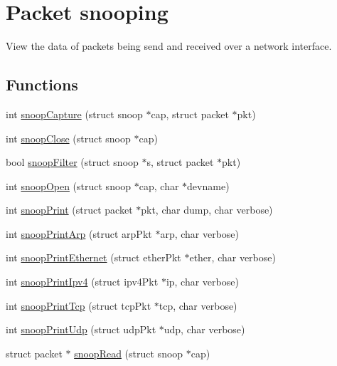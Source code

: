 \hypertarget{group__snoop}{\section{Packet snooping}
\label{group__snoop}
}


View the data of packets being send and received over a network interface.  


\subsection*{Functions}
\begin{DoxyCompactItemize}
\item 
int \hyperlink{group__snoop_ga1bcdee28f29ef9b2e790d0e39871fdd3}{snoop\-Capture} (struct snoop $\ast$cap, struct packet $\ast$pkt)
\item 
int \hyperlink{group__snoop_ga691f48c82b34dc4f0031b093b4227dc8}{snoop\-Close} (struct snoop $\ast$cap)
\item 
bool \hyperlink{group__snoop_gad3d7bd692fbd57fac6dc2deb61e5a4a8}{snoop\-Filter} (struct snoop $\ast$s, struct packet $\ast$pkt)
\item 
int \hyperlink{group__snoop_ga171423235279a08ae66ef9202d8b67d0}{snoop\-Open} (struct snoop $\ast$cap, char $\ast$devname)
\item 
int \hyperlink{group__snoop_ga7b1e800cd9ce296ebed79dfa63c819cd}{snoop\-Print} (struct packet $\ast$pkt, char dump, char verbose)
\item 
int \hyperlink{group__snoop_ga3fc174d739bc0773bd97032abfa3b1bd}{snoop\-Print\-Arp} (struct arp\-Pkt $\ast$arp, char verbose)
\item 
int \hyperlink{group__snoop_ga01d53f2ea61edda428b3308039d212b6}{snoop\-Print\-Ethernet} (struct ether\-Pkt $\ast$ether, char verbose)
\item 
int \hyperlink{group__snoop_gad2dd7ae5fa180f1cf7cb76c6ebea729a}{snoop\-Print\-Ipv4} (struct ipv4\-Pkt $\ast$ip, char verbose)
\item 
int \hyperlink{group__snoop_ga7e33d8bb0e58d1b89c1380867b781d87}{snoop\-Print\-Tcp} (struct tcp\-Pkt $\ast$tcp, char verbose)
\item 
int \hyperlink{group__snoop_ga425009cf908f5daf889d43e081f03d50}{snoop\-Print\-Udp} (struct udp\-Pkt $\ast$udp, char verbose)
\item 
struct packet $\ast$ \hyperlink{group__snoop_ga22815031f9bd75ab791f17e5ccb922c8}{snoop\-Read} (struct snoop $\ast$cap)
\end{DoxyCompactItemize}


